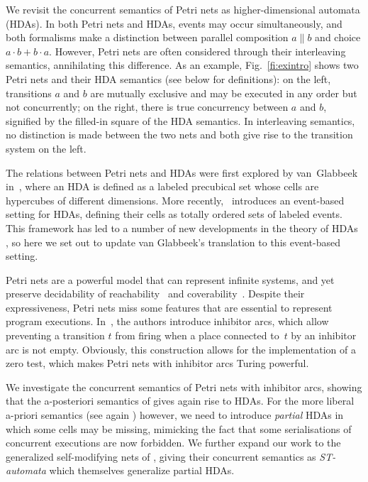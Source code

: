 \documentclass[runningheads,envcountsame]{llncs}
\begin{document}
We
revisit the concurrent semantics of Petri nets as higher-dimensional automata (HDAs).
In both Petri nets and HDAs, events may occur simultaneously,
and both formalisms make a distinction between parallel composition $a \parallel b$ and choice $a\cdot b + b\cdot a$.
However, Petri nets are often considered through their interleaving semantics, annihilating this difference.
As an example, Fig.~\ref{fi:exintro} shows two Petri nets and their HDA semantics
(see below for definitions):
on the left, transitions $a$ and $b$ are mutually exclusive and may be executed in any order but not concurrently;
on the right, there is true concurrency between $a$ and $b$, signified by the filled-in square of the HDA semantics.
In interleaving semantics, no distinction is made between the two nets and both give rise to the transition system on the left.

The relations between Petri nets and HDAs were first explored by van~Glab\-beek in~\cite{DBLP:journals/tcs/Glabbeek06},
where an HDA is defined as a labeled precubical set whose
cells are hypercubes of different dimensions.
More recently, \cite{Hdalang}~introduces an event-based setting for HDAs,
defining their cells as totally ordered sets of labeled events.
This framework has led to a number of new developments in the theory of HDAs \cite{%
  DBLP:journals/lmcs/FahrenbergJSZ24,
  DBLP:journals/fuin/FahrenbergZ24,
  DBLP:conf/ictac/AmraneBFZ23,
  DBLP:conf/dlt/AmraneBFF24},
so here we set out to update van Glabbeek's translation to this event-based setting.

Petri nets are a powerful model that can represent infinite systems,
and yet preserve decidability of reachability~\cite{Mayr81} and coverability~\cite{KarpM69}.
Despite their expressiveness, Petri nets miss some features that are essential to represent program executions.
In~\cite{FA73}, the authors introduce inhibitor arcs,
which allow preventing a transition $t$ from firing when a place connected to~$t$ by an inhibitor arc is not empty.
Obviously, this construction allows for the implementation of a zero test,
which makes Petri nets with inhibitor arcs Turing powerful.

We investigate the concurrent semantics of Petri nets with inhibitor arcs,
showing that the a-posteriori semantics of \cite{DBLP:journals/iandc/JanickiK95} gives again rise to HDAs.
For the more liberal a-priori semantics (see again \cite{DBLP:journals/iandc/JanickiK95}) however,
we need to introduce \emph{partial} HDAs in which some cells may be missing,
mimicking the fact that some serialisations of concurrent executions are now forbidden.
We further expand our work to the generalized self-modifying nets of \cite{DBLP:conf/icalp/DufourdFS98},
giving their concurrent semantics as \emph{ST-automata} which themselves generalize partial HDAs.
\end{document}
